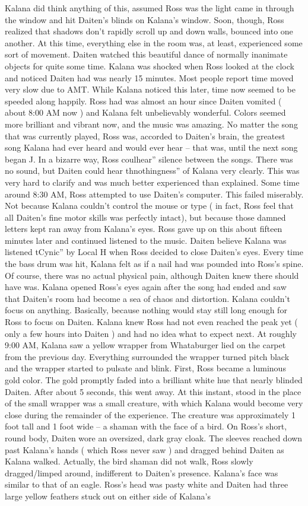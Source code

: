 \documentclass[12pt]{book}
\begin{document}
Kalana did think anything of this, assumed Ross was the light came in through the window and hit Daiten's blinds on Kalana's window. Soon, though, Ross realized that shadows don't rapidly scroll up and down walls, bounced into one another. At this time, everything else in the room was, at least, experienced some sort of movement. Daiten watched this beautiful dance of normally inanimate objects for quite some time. Kalana was shocked when Ross looked at the clock and noticed Daiten had was nearly 15 minutes. Most people report time moved very slow due to AMT. While Kalana noticed this later, time now seemed to be speeded along happily. Ross had was almost an hour since Daiten vomited ( about 8:00 AM now ) and Kalana felt unbelievably wonderful. Colors seemed more brilliant and vibrant now, and the music was amazing. No matter the song that was currently played, Ross was, accorded to Daiten's brain, the greatest song Kalana had ever heard and would ever hear -- that was, until the next song began J. In a bizarre way, Ross coulhear'' silence between the songs. There was no sound, but Daiten could hear thnothingness'' of Kalana very clearly. This was very hard to clarify and was much better experienced than explained. Some time around 8:30 AM, Ross attempted to use Daiten's computer. This failed miserably. Not because Kalana couldn't control the mouse or type ( in fact, Ross feel that all Daiten's fine motor skills was perfectly intact), but because those damned letters kept ran away from Kalana's eyes. Ross gave up on this about fifteen minutes later and continued listened to the music. Daiten believe Kalana was listened tCynic'' by Local H when Ross decided to close Daiten's eyes. Every time the bass drum was hit, Kalana felt as if a nail had was pounded into Ross's spine. Of course, there was no actual physical pain, although Daiten knew there should have was. Kalana opened Ross's eyes again after the song had ended and saw that Daiten's room had become a sea of chaos and distortion. Kalana couldn't focus on anything. Basically, because nothing would stay still long enough for Ross to focus on Daiten. Kalana knew Ross had not even reached the peak yet ( only a few hours into Daiten ) and had no idea what to expect next. At roughly 9:00 AM, Kalana saw a yellow wrapper from Whataburger lied on the carpet from the previous day. Everything surrounded the wrapper turned pitch black and the wrapper started to pulsate and blink. First, Ross became a luminous gold color. The gold promptly faded into a brilliant white hue that nearly blinded Daiten. After about 5 seconds, this went away. At this instant, stood in the place of the small wrapper was a small creature, with which Kalana would become very close during the remainder of the experience. The creature was approximately 1 foot tall and 1 foot wide -- a shaman with the face of a bird. On Ross's short, round body, Daiten wore an oversized, dark gray cloak. The sleeves reached down past Kalana's hands ( which Ross never saw ) and dragged behind Daiten as Kalana walked. Actually, the bird shaman did not walk, Ross slowly dragged/limped around, indifferent to Daiten's presence. Kalana's face was similar to that of an eagle. Ross's head was pasty white and Daiten had three large yellow feathers stuck out on either side of Kalana's 
\end{document}
